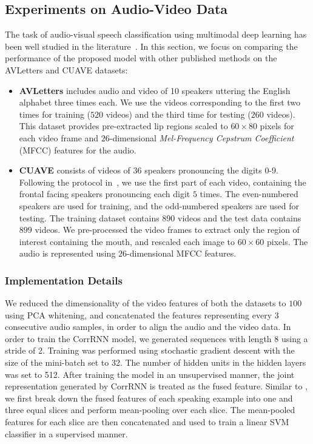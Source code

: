 \documentclass[10pt,twocolumn,letterpaper]{article}
\begin{document}
\subsection{Experiments on Audio-Video Data}
\label{sec:exp2}
The task of audio-visual speech classification using multimodal deep learning has been well studied in the literature~\cite{hu2016temporal,ngiam2011multimodal}. In this section, we focus on comparing the performance of the proposed model with other published methods on the AVLetters and CUAVE datasets:
\begin{itemize}
\item \textbf{AVLetters} \cite{matthews2002extraction} includes audio and video of 10 speakers uttering the English alphabet three times each. We use the videos corresponding to the first two times for training ($520$ videos) and the third time for testing ($260$ videos). This dataset provides pre-extracted lip regions scaled to $60 \times 80$ pixels for each video frame and $26$-dimensional \textit{Mel-Frequency Cepstrum Coefficient} (MFCC) features for the audio.

\item \textbf{CUAVE} \cite{patterson2002cuave} consists of videos of $36$ speakers pronouncing the digits 0-9. Following the protocol in~\cite{ngiam2011multimodal}, we use the first part of each video, containing the frontal facing speakers pronouncing each digit $5$ times. The even-numbered speakers are used for training, and the odd-numbered speakers are used for testing. The training dataset contains $890$ videos and the test data contains $899$ videos. We pre-processed the video frames to extract only the region of interest containing the mouth, and rescaled each image to $60 \times 60$ pixels. The audio is represented using $26$-dimensional MFCC features.

\end{itemize}
\subsubsection{Implementation Details}
We reduced the dimensionality of the video features of both the datasets to $100$ using PCA whitening, and concatenated the features representing every $3$ consecutive audio samples, in order to align the audio and the video data. 
In order to train the CorrRNN model, we generated sequences with length 8 using a stride of 2. Training was performed using stochastic gradient descent with the size of the mini-batch set to 32. The number of hidden units in the hidden layers was set to 512. %
After training the model in an unsupervised manner, the joint representation generated by CorrRNN is treated as the fused feature. Similar to \cite{hu2016temporal}, we first break down the fused features of each speaking example into one and three equal slices and perform mean-pooling over each slice. The  mean-pooled features for each slice are then concatenated and used to train a linear SVM classifier in a supervised manner.
\end{document}
